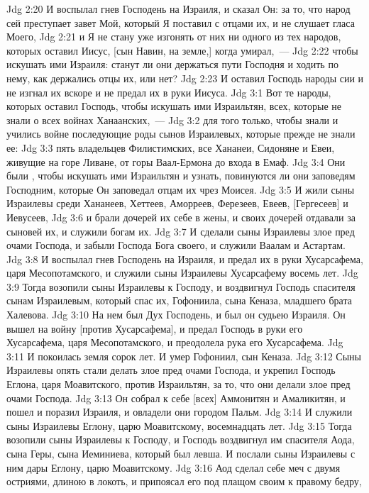 \vs Jdg 2:20 И воспылал гнев Господень на Израиля, и сказал Он: за то, что народ сей преступает завет Мой, который Я поставил с отцами их, и не слушает гласа Моего,
\vs Jdg 2:21 и Я не стану уже изгонять от них ни одного из тех народов, которых оставил Иисус, [сын Навин, на земле,] когда умирал,~---
\vs Jdg 2:22 чтобы искушать ими Израиля: станут ли они держаться пути Господня и ходить по нему, как держались отцы их, или нет?
\vs Jdg 2:23 И оставил Господь народы сии и не изгнал их вскоре и не предал их в руки Иисуса.
\vs Jdg 3:1 Вот те народы, которых оставил Господь, чтобы искушать ими Израильтян, всех, которые не знали о всех войнах Ханаанских,~---
\vs Jdg 3:2 для того только, чтобы знали и учились войне последующие роды сынов Израилевых, которые прежде не знали ее:
\vs Jdg 3:3 пять владельцев Филистимских, все Хананеи, Сидоняне и Евеи, живущие на горе Ливане, от горы Ваал-Ермона до входа в Емаф.
\vs Jdg 3:4 Они были , чтобы искушать ими Израильтян и узнать, повинуются ли они заповедям Господним, которые Он заповедал отцам их чрез Моисея.
\vs Jdg 3:5 И жили сыны Израилевы среди Хананеев, Хеттеев, Аморреев, Ферезеев, Евеев, [Гергесеев] и Иевусеев,
\vs Jdg 3:6 и брали дочерей их себе в жены, и своих дочерей отдавали за сыновей их, и служили богам их.
\vs Jdg 3:7 И сделали сыны Израилевы злое пред очами Господа, и забыли Господа Бога своего, и служили Ваалам и Астартам.
\vs Jdg 3:8 И воспылал гнев Господень на Израиля, и предал их в руки Хусарсафема, царя Месопотамского, и служили сыны Израилевы Хусарсафему восемь лет.
\vs Jdg 3:9 Тогда возопили сыны Израилевы к Господу, и воздвигнул Господь спасителя сынам Израилевым, который спас их, Гофониила, сына Кеназа, младшего брата Халевова.
\vs Jdg 3:10 На нем был Дух Господень, и был он судьею Израиля. Он вышел на войну [против Хусарсафема], и предал Господь в руки его Хусарсафема, царя Месопотамского, и преодолела рука его Хусарсафема.
\vs Jdg 3:11 И покоилась земля сорок лет. И умер Гофониил, сын Кеназа.
\rsbpar\vs Jdg 3:12 Сыны Израилевы опять стали делать злое пред очами Господа, и укрепил Господь Еглона, царя Моавитского, против Израильтян, за то, что они делали злое пред очами Господа.
\vs Jdg 3:13 Он собрал к себе [всех] Аммонитян и Амаликитян, и пошел и поразил Израиля, и овладели они городом Пальм.
\vs Jdg 3:14 И служили сыны Израилевы Еглону, царю Моавитскому, восемнадцать лет.
\vs Jdg 3:15 Тогда возопили сыны Израилевы к Господу, и Господь воздвигнул им спасителя Аода, сына Геры, сына Иеминиева, который был левша. И послали сыны Израилевы с ним дары Еглону, царю Моавитскому.
\vs Jdg 3:16 Аод сделал себе меч с двумя остриями, длиною в локоть, и припоясал его под плащом своим к правому бедру,
